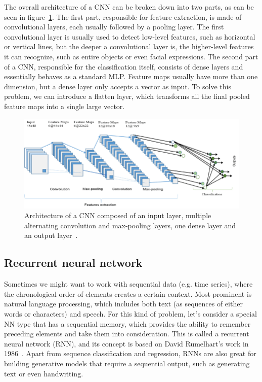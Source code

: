 The overall architecture of a CNN can be broken down into two parts, as can be seen in figure~\ref{fig:cnn-architecture}.
The first part, responsible for feature extraction, is made of convolutional layers,
each usually followed by a pooling layer. The first convolutional layer
is usually used to detect low-level features, such as horizontal or vertical lines, but the
deeper a convolutional layer is, the higher-level features it can recognize, such
as entire objects or even facial expressions.
The second part of a CNN, responsible for the classification itself, consists of dense layers
and essentially behaves as a standard MLP. Feature maps usually have more than one dimension,
but a dense layer only accepts a vector as input.
To solve this problem, we can introduce a flatten layer, which transforms all the final pooled
feature maps into a single large vector.

\begin{figure}[!ht]
    \centering
    \includegraphics[width=\linewidth]{obrazky-figures/cnn-architecture.png}
    \caption{Architecture of a CNN composed of an input layer, multiple alternating
    convolution and max-pooling layers, one dense layer and an output
    layer~\cite[Figure~9]{soa-dl-theory-architectures}.}
    \label{fig:cnn-architecture}
\end{figure}


\subsection*{Recurrent neural network}
\label{recurrent-neural-network}
Sometimes we might want to work with sequential data (e.g. time series), where the chronological order
of elements creates a certain context.
Most prominent is natural language processing, which includes both text (as sequences
of either words or characters) and speech.
For this kind of problem,
let's consider a special NN type that has a sequential memory,
which provides the ability to remember preceding elements and take them into consideration.
This is called a recurrent neural network (RNN), and its concept is based
on David Rumelhart's work in 1986~\cite{rumelhart1986learning}.
Apart from sequence classification and regression, RNNs are also great for building generative models
that require a sequential output, such as generating text or even handwriting.

